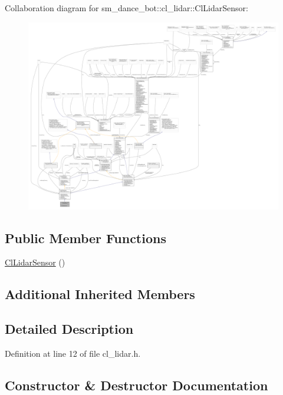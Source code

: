 Collaboration diagram for sm\+\_\+dance\+\_\+bot\+:\+:cl\+\_\+lidar\+:\+:Cl\+Lidar\+Sensor\+:
\nopagebreak
\begin{figure}[H]
\begin{center}
\leavevmode
\includegraphics[width=350pt]{classsm__dance__bot_1_1cl__lidar_1_1ClLidarSensor__coll__graph}
\end{center}
\end{figure}
\subsection*{Public Member Functions}
\begin{DoxyCompactItemize}
\item 
\hyperlink{classsm__dance__bot_1_1cl__lidar_1_1ClLidarSensor_a1d3da358f132075aa25d4e647fc93924}{Cl\+Lidar\+Sensor} ()
\end{DoxyCompactItemize}
\subsection*{Additional Inherited Members}


\subsection{Detailed Description}


Definition at line 12 of file cl\+\_\+lidar.\+h.



\subsection{Constructor \& Destructor Documentation}
\mbox{\label{classsm__dance__bot_1_1cl__lidar_1_1ClLidarSensor_a1d3da358f132075aa25d4e647fc93924}} 

